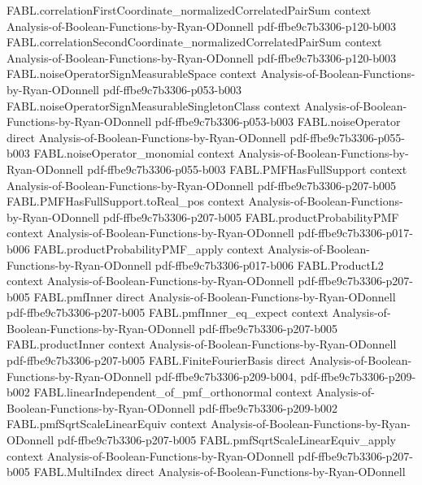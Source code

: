 \begin{theorem}
  {FABL.correlationFirstCoordinate_normalizedCorrelatedPairSum}
  {context}
  {Analysis-of-Boolean-Functions-by-Ryan-ODonnell}
  {pdf-ffbe9c7b3306-p120-b003}
\proofstep
  {FABL.correlationSecondCoordinate_normalizedCorrelatedPairSum}
  {context}
  {Analysis-of-Boolean-Functions-by-Ryan-ODonnell}
  {pdf-ffbe9c7b3306-p120-b003}
\proofstep
  {FABL.noiseOperatorSignMeasurableSpace}
  {context}
  {Analysis-of-Boolean-Functions-by-Ryan-ODonnell}
  {pdf-ffbe9c7b3306-p053-b003}
\proofstep
  {FABL.noiseOperatorSignMeasurableSingletonClass}
  {context}
  {Analysis-of-Boolean-Functions-by-Ryan-ODonnell}
  {pdf-ffbe9c7b3306-p053-b003}
\proofstep
  {FABL.noiseOperator}
  {direct}
  {Analysis-of-Boolean-Functions-by-Ryan-ODonnell}
  {pdf-ffbe9c7b3306-p055-b003}
\proofstep
  {FABL.noiseOperator_monomial}
  {context}
  {Analysis-of-Boolean-Functions-by-Ryan-ODonnell}
  {pdf-ffbe9c7b3306-p055-b003}
\proofstep
  {FABL.PMFHasFullSupport}
  {context}
  {Analysis-of-Boolean-Functions-by-Ryan-ODonnell}
  {pdf-ffbe9c7b3306-p207-b005}
\proofstep
  {FABL.PMFHasFullSupport.toReal_pos}
  {context}
  {Analysis-of-Boolean-Functions-by-Ryan-ODonnell}
  {pdf-ffbe9c7b3306-p207-b005}
\proofstep
  {FABL.productProbabilityPMF}
  {context}
  {Analysis-of-Boolean-Functions-by-Ryan-ODonnell}
  {pdf-ffbe9c7b3306-p017-b006}
\proofstep
  {FABL.productProbabilityPMF_apply}
  {context}
  {Analysis-of-Boolean-Functions-by-Ryan-ODonnell}
  {pdf-ffbe9c7b3306-p017-b006}
\proofstep
  {FABL.ProductL2}
  {context}
  {Analysis-of-Boolean-Functions-by-Ryan-ODonnell}
  {pdf-ffbe9c7b3306-p207-b005}
\proofstep
  {FABL.pmfInner}
  {direct}
  {Analysis-of-Boolean-Functions-by-Ryan-ODonnell}
  {pdf-ffbe9c7b3306-p207-b005}
\proofstep
  {FABL.pmfInner_eq_expect}
  {context}
  {Analysis-of-Boolean-Functions-by-Ryan-ODonnell}
  {pdf-ffbe9c7b3306-p207-b005}
\proofstep
  {FABL.productInner}
  {context}
  {Analysis-of-Boolean-Functions-by-Ryan-ODonnell}
  {pdf-ffbe9c7b3306-p207-b005}
\proofstep
  {FABL.FiniteFourierBasis}
  {direct}
  {Analysis-of-Boolean-Functions-by-Ryan-ODonnell}
  {pdf-ffbe9c7b3306-p209-b004,
    pdf-ffbe9c7b3306-p209-b002}
\proofstep
  {FABL.linearIndependent_of_pmf_orthonormal}
  {context}
  {Analysis-of-Boolean-Functions-by-Ryan-ODonnell}
  {pdf-ffbe9c7b3306-p209-b002}
\proofstep
  {FABL.pmfSqrtScaleLinearEquiv}
  {context}
  {Analysis-of-Boolean-Functions-by-Ryan-ODonnell}
  {pdf-ffbe9c7b3306-p207-b005}
\proofstep
  {FABL.pmfSqrtScaleLinearEquiv_apply}
  {context}
  {Analysis-of-Boolean-Functions-by-Ryan-ODonnell}
  {pdf-ffbe9c7b3306-p207-b005}
\proofstep
  {FABL.MultiIndex}
  {direct}
  {Analysis-of-Boolean-Functions-by-Ryan-ODonnell}

\end{theorem}
